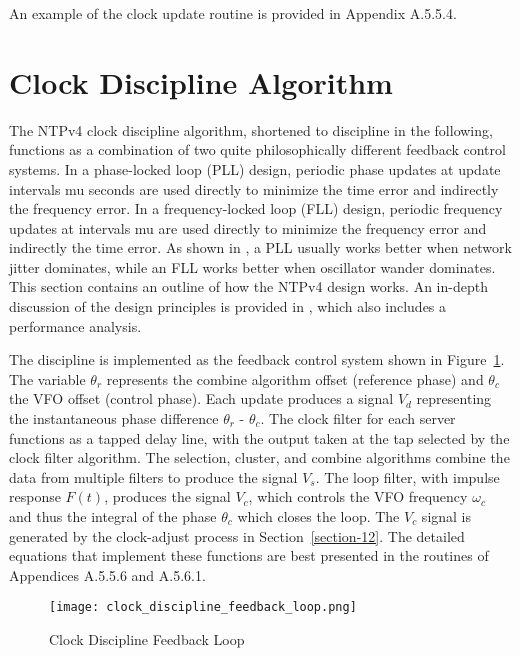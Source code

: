 An example of the clock update routine is provided in
Appendix A.5.5.4.

\section{Clock Discipline Algorithm}
\label{section-11-3}

The NTPv4 clock discipline algorithm, shortened to discipline in the
following, functions as a combination of two quite philosophically
different feedback control systems.  In a phase-locked loop (PLL)
design, periodic phase updates at update intervals mu seconds are
used directly to minimize the time error and indirectly the frequency
error.  In a frequency-locked loop (FLL) design, periodic frequency
updates at intervals mu are used directly to minimize the frequency
error and indirectly the time error.  As shown in \cite{ref7}, a PLL
usually works better when network jitter dominates, while an FLL
works better when oscillator wander dominates.  This section contains
an outline of how the NTPv4 design works.  An in-depth discussion of
the design principles is provided in \cite{ref7}, which also includes a
performance analysis.

The discipline is implemented as the feedback control system shown in
Figure~\ref{clock_discipline_feedback_loop}.  The variable $ \theta_r $ represents the combine algorithm
offset (reference phase) and $ \theta_c $ the VFO offset (control phase).
Each update produces a signal $ V_d $ representing the instantaneous
phase difference $ \theta_r $ - $ \theta_c $.  The clock filter for each server
functions as a tapped delay line, with the output taken at the tap
selected by the clock filter algorithm.  The selection, cluster, and
combine algorithms combine the data from multiple filters to produce
the signal $ V_s $.  The loop filter, with impulse response $ F(t) $,
produces the signal $ V_c $, which controls the VFO frequency $ \omega_c $ and
thus the integral of the phase $ \theta_c $ which closes the loop.  The
$ V_c $ signal is generated by the clock-adjust process in Section~\ref{section-12}.
The detailed equations that implement these functions are best
presented in the routines of Appendices A.5.5.6 and A.5.6.1.

\begin{figure}
\centering
\texttt{[image: clock\_discipline\_feedback\_loop.png]}
\caption{Clock Discipline Feedback Loop}
\label{clock_discipline_feedback_loop}
\end{figure}

